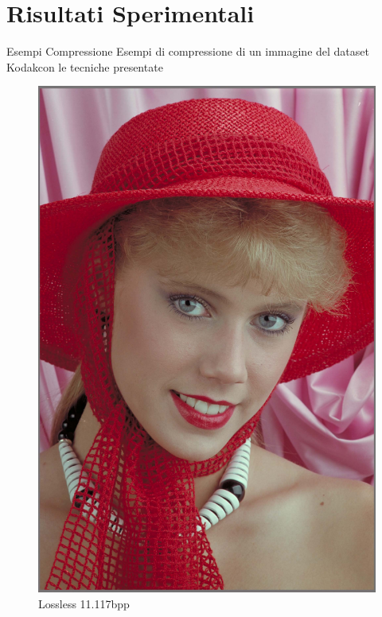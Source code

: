 \section{Risultati Sperimentali}

    \begin{frame}{Esempi Compressione}
        Esempi di compressione di un immagine del dataset Kodak\footnotemark[1] con le tecniche presentate\\
        \begin{figure}[!ht]
            \begin{minipage}[]{0.13\linewidth}
                \centering
                \includegraphics[width=\textwidth]{Immagini/IMAGES/PNG_IMG0004.pdf}
                \caption{Lossless 11.117bpp}
                \label{fig:Lossless}
            \end{minipage}

\end{figure}
\end{frame}
